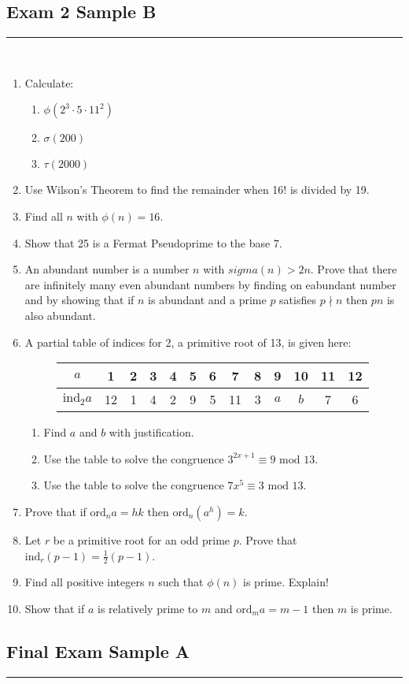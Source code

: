 \documentclass[class=article, crop=false]{standalone}
\def\ord{{\text{ord}}}
\def\ind{{\text{ind}}}
\begin{document}
\subsection*{Exam 2 Sample B}
\rule{\textwidth}{1pt}\\
\begin{enumerate}
	\item Calculate:
	\begin{enumerate}
		\item $\phi(2^3\cdot 5\cdot 11^2)$
		\item $\sigma(200)$
		\item $\tau(2000)$
	\end{enumerate}

	\item Use Wilson's Theorem to find the remainder when 16! is divided by 19.
	
	\item Find all $n$ with $\phi(n)=16$.
	
	\item Show that 25 is a Fermat Pseudoprime to the base 7.
	
	\item An abundant number is a number $n$ with $sigma(n) > 2n$. Prove that there are
	infinitely many even abundant numbers by finding on eabundant number and by showing
	that if $n$ is abundant and a prime $p$ satisfies $p\nmid n$ then $pn$ is also abundant.

	\item A partial table of indices for 2, a primitive root of 13, is given here:
	\begin{figure}[h]
    \centering
    \begin{tabular}{|c|c|c|c|c|c|c|c|c|c|c|c|c|}
      \hline
      $a$ & 1 & 2 & 3 & 4 & 5 & 6 & 7 & 8 & 9 & 10 & 11 & 12 \\
      \hline
      $\ind_2 a$ & 12 & 1 & 4 & 2 & 9 & 5 & 11 & 3 & $a$ & $b$ & 7 & 6 \\
      \hline
    \end{tabular}
    \end{figure}
	\begin{enumerate}
		\item Find $a$ and $b$ with justification.
		\item Use the table to solve the congruence $3^{2x+1}\equiv 9\mbox{ mod } 13$.
		\item Use the table to solve the congruence $7x^5 \equiv 3\mbox{ mod } 13$.
	\end{enumerate}

	\item Prove that if $\ord_n a = hk$ then $\ord_n (a^h)= k$.
	
	\item Let $r$ be a primitive root for an odd prime $p$. Prove that $\ind_r (p-1) = \frac{1}{2}(p-1)$.
	
	\item Find all positive integers $n$ such that $\phi(n)$ is prime. Explain!
	
	\item Show that if $a$ is relatively prime to $m$ and $\ord_m a=m-1$ then $m$ is prime.
\end{enumerate}

\subsection*{Final Exam Sample A}
\rule{\textwidth}{1pt}\\
\end{document}
